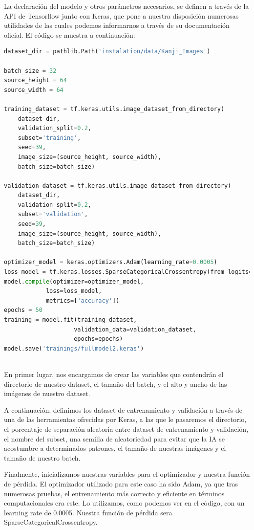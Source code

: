 \documentclass{article}
\begin{document}
La declaración del modelo y otros parámetros necesarios, se definen a través de la API de Tensorflow junto con Keras, que pone a nuestra disposición numerosas utilidades de las cuales podemos informarnos a través de su documentación oficial. El código se muestra a continuación:

\noindent\begin{minipage}{\textwidth}
\begin{lstlisting}[language=python]
dataset_dir = pathlib.Path('instalation/data/Kanji_Images')  

batch_size = 32  
source_height = 64  
source_width = 64  

training_dataset = tf.keras.utils.image_dataset_from_directory(
	dataset_dir,  
	validation_split=0.2,  
	subset='training',  
	seed=39,  
	image_size=(source_height, source_width),  
	batch_size=batch_size)  

validation_dataset = tf.keras.utils.image_dataset_from_directory(
	dataset_dir,
	validation_split=0.2,
	subset='validation',
	seed=39,
	image_size=(source_height, source_width),
	batch_size=batch_size)
    
optimizer_model = keras.optimizers.Adam(learning_rate=0.0005)
loss_model = tf.keras.losses.SparseCategoricalCrossentropy(from_logits=True)
model.compile(optimizer=optimizer_model,
          	loss=loss_model,
          	metrics=['accuracy'])
epochs = 50
training = model.fit(training_dataset,
                 	validation_data=validation_dataset,
                 	epochs=epochs)
model.save('trainings/fullmodel2.keras')
\end{lstlisting}
\end{minipage}\\

En primer lugar, nos encargamos de crear las variables que contendrán el directorio de nuestro dataset, el tamaño del batch, y el alto y ancho de las imágenes de nuestro dataset.

A continuación, definimos los dataset de entrenamiento y validación a través de una de las herramientas ofrecidas por Keras, a las que le pasaremos el directorio, el porcentaje de separación aleatoria entre dataset de entrenamiento y validación, el nombre del subset, una semilla de aleatoriedad para evitar que la IA se acostumbre a determinados patrones, el tamaño de nuestras imágenes y el tamaño de nuestro batch.

Finalmente, inicializamos nuestras variables para el optimizador y nuestra función de pérdida. El optimizador utilizado para este caso ha sido Adam, ya que tras numerosas pruebas, el entrenamiento más correcto y eficiente en términos computacionales era este. Lo utilizamos, como podemos ver en el código, con un learning rate de 0.0005. Nuestra función de pérdida sera SparseCategoricalCrossentropy.
\end{document}
